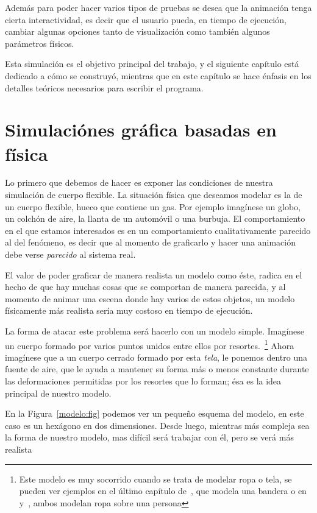 Además para poder hacer varios tipos de pruebas se desea que la animación tenga cierta interactividad, es decir que el usuario pueda, en tiempo de ejecución, cambiar algunas opciones tanto de visualización como también algunos parámetros físicos.

Esta simulación es el objetivo principal del trabajo, y el siguiente capítulo está dedicado a cómo se construyó, mientras que en este capítulo se hace énfasis en los detalles teóricos necesarios para escribir el programa.

\section{Simulaciónes gráfica basadas en física}

Lo primero que debemos de hacer es exponer las condiciones de nuestra simulación de cuerpo flexible. La situación física que deseamos modelar es la de un cuerpo flexible, hueco que contiene un gas.
Por ejemplo imagínese un globo, un colchón de aire, la llanta de un automóvil o una burbuja.
El comportamiento en el que estamos interesados es en un comportamiento cualitativamente parecido al del fenómeno, es decir que al momento de graficarlo y hacer una animación debe verse \emph{parecido} al sistema real.

El valor de poder graficar de manera realista un modelo como éste, radica en el hecho de que hay muchas cosas que se comportan de manera parecida, y al momento de animar una escena donde hay varios de estos objetos, un modelo físicamente más realista sería muy costoso en tiempo de ejecución.

La forma de atacar este problema será hacerlo con un modelo simple.
Imagínese un cuerpo formado por varios puntos unidos entre ellos por resortes.~\footnote{Este modelo es muy socorrido cuando se trata de modelar ropa o tela, se pueden ver ejemplos en el último capítulo de~\cite{FisicaVideojuegos}, que modela una bandera o en~\cite{Vassilev:Ropa} y~\cite{Provot:Ropa}, ambos modelan ropa sobre una persona}
Ahora imagínese que a un cuerpo cerrado formado por esta \emph{tela}, le ponemos dentro una fuente de aire, que le ayuda a mantener su forma más o menos constante durante las deformaciones permitidas por los resortes que lo forman; ésa es la idea principal de nuestro modelo.

En la Figura~\ref{modelo:fig} podemos ver un pequeño esquema del modelo, en este caso es un hexágono en dos dimensiones.
Desde luego, mientras más compleja sea la forma de nuestro modelo, mas difícil será trabajar con él, pero se verá más realista 

